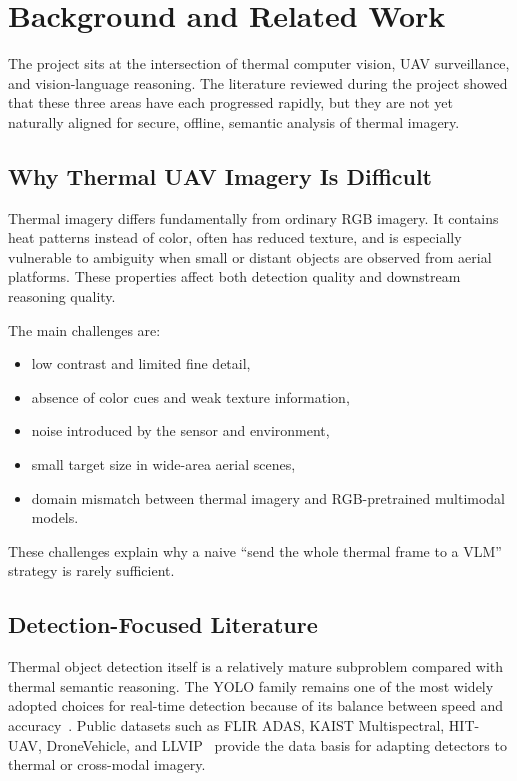 \section{Background and Related Work}
\label{sec:background}

The project sits at the intersection of thermal computer vision, UAV surveillance, and
vision-language reasoning. The literature reviewed during the project showed that these
three areas have each progressed rapidly, but they are not yet naturally aligned for secure,
offline, semantic analysis of thermal imagery.

\subsection{Why Thermal UAV Imagery Is Difficult}

Thermal imagery differs fundamentally from ordinary RGB imagery. It contains heat patterns
instead of color, often has reduced texture, and is especially vulnerable to ambiguity when
small or distant objects are observed from aerial platforms. These properties affect both
detection quality and downstream reasoning quality.

The main challenges are:

\begin{itemize}[nosep]
  \item low contrast and limited fine detail,
  \item absence of color cues and weak texture information,
  \item noise introduced by the sensor and environment,
  \item small target size in wide-area aerial scenes,
  \item domain mismatch between thermal imagery and RGB-pretrained multimodal models.
\end{itemize}

These challenges explain why a naive ``send the whole thermal frame to a VLM'' strategy is
rarely sufficient.

\subsection{Detection-Focused Literature}

Thermal object detection itself is a relatively mature subproblem compared with thermal
semantic reasoning. The YOLO family remains one of the most widely adopted choices for
real-time detection because of its balance between speed and accuracy~\cite{yolov8}. Public
datasets such as FLIR ADAS, KAIST Multispectral, HIT-UAV, DroneVehicle, and
LLVIP~\cite{flir,kaist2015,hituav2022,dronevehicle2022,llvip2021} provide the data basis
for adapting detectors to thermal or cross-modal imagery.


